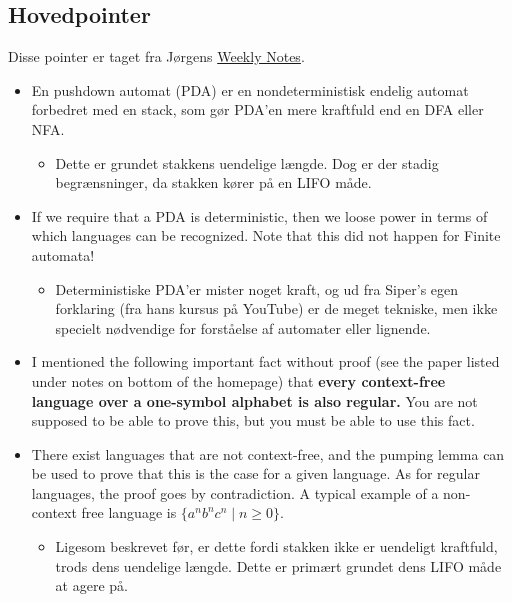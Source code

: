 \subsection{Hovedpointer}%
\label{subsec:keypoints}

Disse pointer er taget fra Jørgens \href{https://imada.sdu.dk/u/jbj/DM553/us3.pdf}{Weekly Notes}.

\begin{itemize}
	\item En pushdown automat (PDA) er en nondeterministisk endelig automat forbedret med en stack, som gør PDA'en mere kraftfuld end en DFA eller NFA.
	      \begin{itemize}
		      \item Dette er grundet stakkens uendelige længde. Dog er der stadig begrænsninger, da stakken kører på en LIFO måde.
	      \end{itemize}

	\item If we require that a PDA is deterministic, then we loose power in terms of which languages can be recognized. Note that this did not happen for Finite automata!
	      \begin{itemize}
		      \item Deterministiske PDA'er mister noget kraft, og ud fra Siper's egen forklaring (fra hans kursus på YouTube) er de meget tekniske, men ikke specielt nødvendige for forståelse af automater eller lignende.
	      \end{itemize}
	\item I mentioned the following important fact without proof (see the paper listed under notes on bottom of the homepage) that \textbf{every context-free language over a one-symbol alphabet is also regular.} You are not supposed to be able to prove this, but you must be
	      able to use this fact.
	\item There exist languages that are not context-free, and the pumping lemma can be used to prove that this is the case for a given language. As for regular languages, the proof goes by  contradiction. A typical example of a non-context free language is $\{a^{n}b^{n}c^{n} \; | \; n \ge 0\}$.
	      \begin{itemize}
		      \item Ligesom beskrevet før, er dette fordi stakken ikke er uendeligt kraftfuld, trods dens uendelige længde. Dette er primært grundet dens LIFO måde at agere på.
	      \end{itemize}


\end{itemize}
